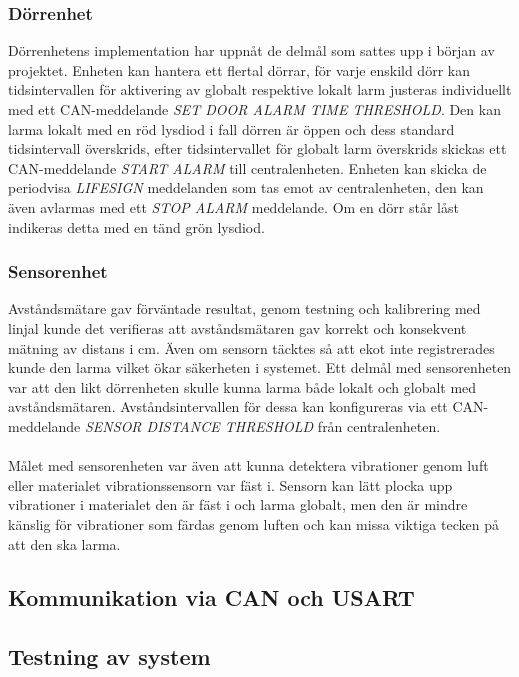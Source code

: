 \documentclass{article}
\begin{document}
\subsubsection{Dörrenhet}
Dörrenhetens implementation har uppnåt de delmål som sattes upp i början av projektet. 
Enheten kan hantera ett flertal dörrar, för varje enskild dörr kan tidsintervallen för aktivering av globalt respektive lokalt larm justeras individuellt med ett CAN-meddelande \emph{SET DOOR ALARM TIME THRESHOLD}. 
Den kan larma lokalt med en röd lysdiod i fall dörren är öppen och dess standard tidsintervall överskrids, efter tidsintervallet för globalt larm överskrids skickas ett CAN-meddelande \emph{START ALARM} till centralenheten.
Enheten kan skicka de periodvisa \emph{LIFESIGN} meddelanden som tas emot av centralenheten, den kan även avlarmas med ett \emph{STOP ALARM} meddelande. Om en dörr står låst indikeras detta med en tänd grön lysdiod.

\subsubsection{Sensorenhet}
Avståndsmätare gav förväntade resultat, genom testning och kalibrering med linjal kunde det verifieras att avståndsmätaren gav korrekt och konsekvent mätning av distans i cm.
Även om sensorn täcktes så att ekot inte registrerades kunde den larma vilket ökar säkerheten i systemet. 
Ett delmål med sensorenheten var att den likt dörrenheten skulle kunna larma både lokalt och globalt med avståndsmätaren. 
Avståndsintervallen för dessa kan konfigureras via ett CAN-meddelande \emph{SENSOR DISTANCE THRESHOLD} från centralenheten.\\
\\
Målet med sensorenheten var även att kunna detektera vibrationer genom luft eller materialet vibrationssensorn var fäst i. Sensorn kan lätt plocka upp vibrationer i materialet den är fäst i och larma globalt, men den är mindre känslig för vibrationer som färdas genom luften och kan missa viktiga tecken på att den ska larma.

\subsection{Kommunikation via CAN och USART}

\subsection{Testning av system}
\end{document}
